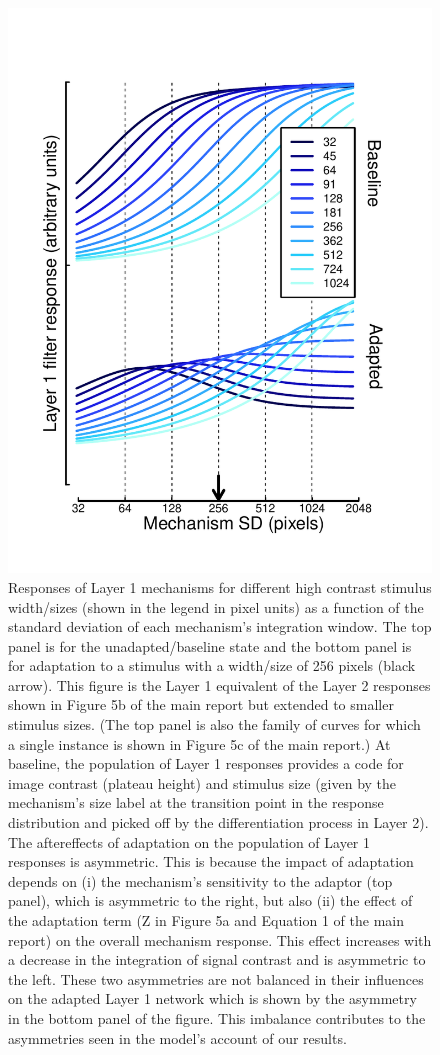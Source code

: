 \documentclass[
]{article}
\begin{document}
\begin{figure}

{\centering \includegraphics[width=0.8\linewidth]{Figures/FigureS5} 

}

\caption{Responses of Layer 1 mechanisms for different high contrast stimulus width/sizes (shown in the legend in pixel units) as a function of the standard deviation of each mechanism’s integration window. The top panel is for the unadapted/baseline state and the bottom panel is for adaptation to a stimulus with a width/size of 256 pixels (black arrow). This figure is the Layer 1 equivalent of the Layer 2 responses shown in Figure 5b of the main report but extended to smaller stimulus sizes. (The top panel is also the family of curves for which a single instance is shown in Figure 5c of the main report.) At baseline, the population of Layer 1 responses provides a code for image contrast (plateau height) and stimulus size (given by the mechanism’s size label at the transition point in the response distribution and picked off by the differentiation process in Layer 2). The aftereffects of adaptation on the population of Layer 1 responses is asymmetric. This is because the impact of adaptation depends on (i) the mechanism’s sensitivity to the adaptor (top panel), which is asymmetric to the right, but also (ii) the effect of the adaptation term (Z in Figure 5a and Equation 1 of the main report) on the overall mechanism response. This effect increases with a decrease in the integration of signal contrast and is asymmetric to the left. These two asymmetries are not balanced in their influences on the adapted Layer 1 network which is shown by the asymmetry in the bottom panel of the figure. This imbalance contributes to the asymmetries seen in the model’s account of our results.}\label{fig:figureS5}
\end{figure}
\end{document}
